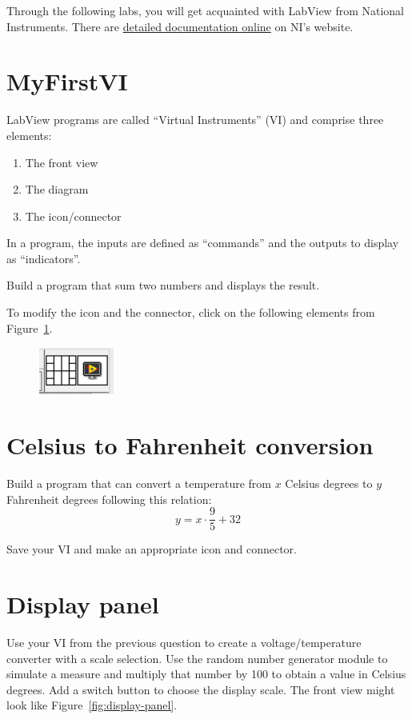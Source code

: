 \documentclass{labo}
\author{GEI}
\begin{document}

Through the following labs, you will get acquainted with LabView from National Instruments.
There are \href{https://www.ni.com/docs/en-US/bundle/labview/page/lvconcepts/labview_fundamentals.html}{detailed documentation online} on NI's website.

\section{MyFirstVI}
LabView programs are called ``Virtual Instruments'' (VI) and comprise three elements:
\begin{enumerate}
	\item The front view
	\item The diagram
	\item The icon/connector
\end{enumerate}

In a program, the inputs are defined as ``commands'' and the outputs to display as ``indicators''.

Build a program that sum two numbers and displays the result.

To modify the icon and the connector, click on the following elements from Figure~\ref{fig:mod-icon-conn}.

\begin{figure}[h!]
\centering
\includegraphics[]{mod-icon-conn.png}
\caption{}\label{fig:mod-icon-conn}
\end{figure}


\section{Celsius to Fahrenheit conversion}
Build a program that can convert a temperature from $x$ Celsius degrees to $y$ Fahrenheit degrees following this relation: $$y = x \cdot \frac{9}{5} + 32$$

Save your VI and make an appropriate icon and connector.



\section{Display panel}
Use your VI from the previous question to create a voltage/temperature converter with a scale selection.
Use the random number generator module to simulate a measure and multiply that number by 100 to obtain a value in Celsius degrees.
Add a switch button to choose the display scale.
The front view might look like Figure~\ref{fig:display-panel}.
\end{document}
